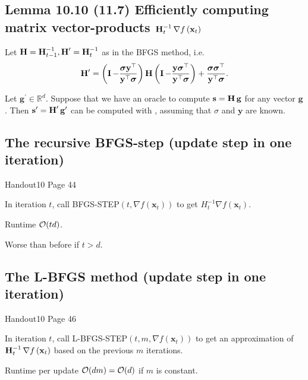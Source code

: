 \subsection*{Lemma 10.10 (11.7) Efficiently computing matrix vector-products $\operatorname{\boldsymbol{\mathbf{H}}}_{t}^{-1} \nabla f\left(\mathbf{x}_{t}\right)$}
Let $\operatorname{\boldsymbol{\mathbf{H}}}=\operatorname{\boldsymbol{\mathbf{H}}}_{t-1}^{-1}, \operatorname{\boldsymbol{\mathbf{H}}}^{\prime}=\operatorname{\boldsymbol{\mathbf{H}}}_{t}^{-1}$ as in the BFGS method, i.e.
$$
\operatorname{\boldsymbol{\mathbf{H}}}^{\prime}=\left(\operatorname{\boldsymbol{\mathbf{I}}}-\frac{\boldsymbol{\sigma} \mathbf{y}^{\top}}{\mathbf{y}^{\top} \boldsymbol{\sigma}}\right) \operatorname{\boldsymbol{\mathbf{H}}}\left(\operatorname{\boldsymbol{\mathbf{I}}}-\frac{\mathbf{y} \boldsymbol{\sigma}^{\top}}{\mathbf{y}^{\top} \boldsymbol{\sigma}}\right)+\frac{\boldsymbol{\sigma} \boldsymbol{\sigma}^{\top}}{\mathbf{y}^{\top} \boldsymbol{\sigma}} .
$$

Let $\mathbf{g}^{\prime} \in \mathbb{R}^{d}$. Suppose that we have an oracle to compute $\mathbf{s}=\operatorname{\boldsymbol{\mathbf{H}}} \mathbf{g}$ for any vector $\mathbf{g}$. Then $\mathbf{s}^{\prime}=\operatorname{\boldsymbol{\mathbf{H}}}^{\prime} \mathbf{g}^{\prime}$ can be computed with , assuming that $\sigma$ and $\mathbf{y}$ are known.


\subsection*{The recursive BFGS-step (update step in one iteration)}
Handout10 Page 44

In iteration $t$, call BFGS-STEP$\left(t, \nabla f\left(\mathbf{x}_{t}\right)\right)$ to get $H_{t}^{-1} \nabla f\left(\mathbf{x}_{t}\right)$.

Runtime $\operatorname{\mathcal{O}}(t d)$.

Worse than before if $t>d$.


\subsection*{The L-BFGS method (update step in one iteration)}
Handout10 Page 46

In iteration $t$, call L-BFGS-STEP$\left(t, m, \nabla f\left(\mathbf{x}_{t}\right)\right)$ to get an approximation of $\operatorname{\boldsymbol{\mathbf{H}}}_{t}^{-1} \nabla f\left(\mathbf{x}_{t}\right)$ based on the previous $m$ iterations.

Runtime per update $\operatorname{\mathcal{O}}(d m)=\operatorname{\mathcal{O}}(d)$ if $m$ is constant.